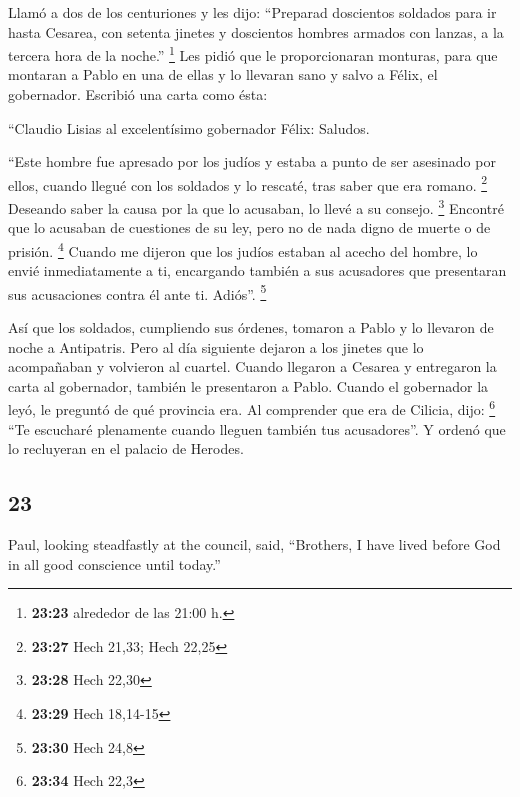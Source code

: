 \begin{paracol}{2}
 Llamó a dos de los centuriones y les dijo: ``Preparad
doscientos soldados para ir hasta Cesarea, con setenta jinetes y
doscientos hombres armados con lanzas, a la tercera hora de la noche.''
\footnote{\textbf{23:23} alrededor de las 21:00 h.}  Les
pidió que le proporcionaran monturas, para que montaran a Pablo en una
de ellas y lo llevaran sano y salvo a Félix, el gobernador.
 Escribió una carta como ésta:

 ``Claudio Lisias al excelentísimo gobernador Félix:
Saludos.

 ``Este hombre fue apresado por los judíos y estaba a
punto de ser asesinado por ellos, cuando llegué con los soldados y lo
rescaté, tras saber que era romano. \footnote{\textbf{23:27} Hech 21,33;
  Hech 22,25}  Deseando saber la causa por la que lo
acusaban, lo llevé a su consejo. \footnote{\textbf{23:28} Hech 22,30}
 Encontré que lo acusaban de cuestiones de su ley, pero
no de nada digno de muerte o de prisión. \footnote{\textbf{23:29} Hech
  18,14-15}  Cuando me dijeron que los judíos estaban al
acecho del hombre, lo envié inmediatamente a ti, encargando también a
sus acusadores que presentaran sus acusaciones contra él ante ti.
Adiós''. \footnote{\textbf{23:30} Hech 24,8}

 Así que los soldados, cumpliendo sus órdenes, tomaron a
Pablo y lo llevaron de noche a Antipatris.  Pero al día
siguiente dejaron a los jinetes que lo acompañaban y volvieron al
cuartel.  Cuando llegaron a Cesarea y entregaron la carta
al gobernador, también le presentaron a Pablo.  Cuando el
gobernador la leyó, le preguntó de qué provincia era. Al comprender que
era de Cilicia, dijo: \footnote{\textbf{23:34} Hech 22,3}
 ``Te escucharé plenamente cuando lleguen también tus
acusadores''. Y ordenó que lo recluyeran en el palacio de Herodes.

\switchcolumn
\begin{otherlanguage}{english}

\hypertarget{section-45}{%
\section{23}\label{section-45}}

 Paul, looking steadfastly at the council, said,
``Brothers, I have lived before God in all good conscience until
today.''


\end{otherlanguage}
\end{paracol}
